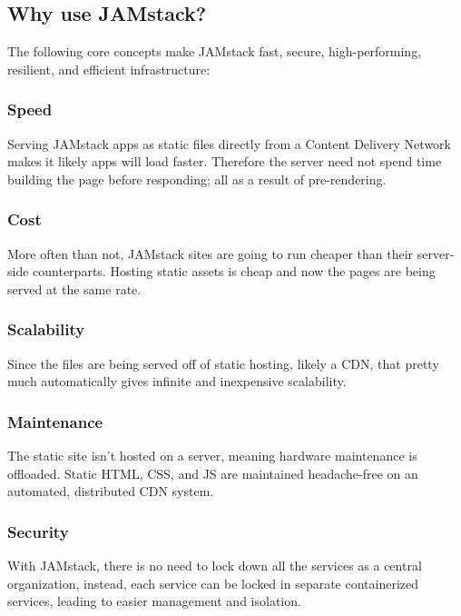 \subsection{Why use JAMstack?}

The following core concepts make JAMstack fast, secure, high-performing, resilient, and efficient infrastructure:

\subsubsection{Speed}

Serving JAMstack apps as static files directly from a Content Delivery Network makes it likely apps will load faster. Therefore the server need not spend time building the page 
before responding; all as a result of pre-rendering. 

\subsubsection{Cost}

More often than not, JAMstack sites are going to run cheaper than their server-side counterparts. 
Hosting static assets is cheap and now the pages are being served at the same rate.

\subsubsection{Scalability}

Since the files are being served off of static hosting, likely a CDN, 
that pretty much automatically gives infinite and inexpensive scalability.

\subsubsection{Maintenance}

The static site isn’t hosted on a server, meaning hardware maintenance is offloaded. 
Static HTML, CSS, and JS are maintained headache-free on an automated, distributed CDN system.

\subsubsection{Security}

With JAMstack, there is no need to lock down all the services as a central organization, instead, 
each service can be locked in separate containerized services, leading to easier management and isolation.


